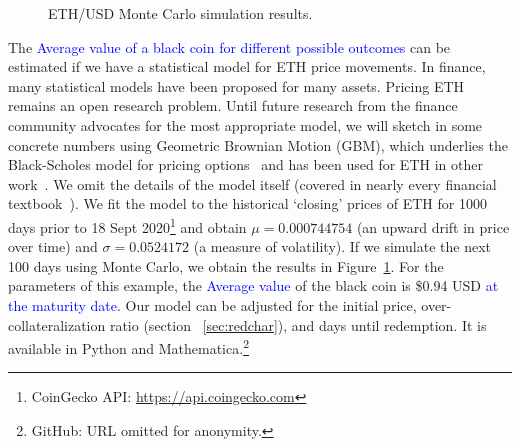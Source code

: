 \begin{figure}[t]
    \centering
        \qquad
    \caption{ETH/USD Monte Carlo simulation results. \label{fig:sim}}
\end{figure}

The \textcolor{blue}{Average value of a black coin for different possible outcomes} can be estimated if we have a statistical model for ETH price movements. In finance, many statistical models have been proposed for many assets. Pricing ETH remains an open research problem. Until future research from the finance community advocates for the most appropriate model, we will sketch in some concrete numbers using Geometric Brownian Motion (GBM), which underlies the Black-Scholes model for pricing options~\cite{BS73} and has been used for ETH in other work~\cite{GPH+20}. We omit the details of the model itself (covered in nearly every  financial textbook~\cite{Sey09}). We fit the model to the historical `closing' prices of ETH for 1000 days prior to 18 Sept 2020\footnote{CoinGecko API: \url{https://api.coingecko.com}} and obtain $\mu=0.000744754$ (an upward drift in price over time) and $\sigma=0.0524172$ (a measure of volatility). If we simulate the next 100 days using Monte Carlo, we obtain the results in Figure~\ref{fig:sim}. For the parameters of this example, the \textcolor{blue}{Average value} of the black coin is \$0.94 USD \textcolor{blue}{at the maturity date}. Our model can be adjusted for the initial price, over-collateralization ratio (section ~\ref{sec:redchar}), and days until redemption. It is available in Python and Mathematica.\footnote{GitHub: URL omitted for anonymity.} 

